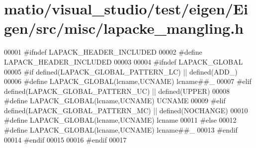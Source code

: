\hypertarget{matio_2visual__studio_2test_2eigen_2_eigen_2src_2misc_2lapacke__mangling_8h_source}{}\section{matio/visual\+\_\+studio/test/eigen/\+Eigen/src/misc/lapacke\+\_\+mangling.h}
\label{matio_2visual__studio_2test_2eigen_2_eigen_2src_2misc_2lapacke__mangling_8h_source}

\begin{DoxyCode}
00001 \textcolor{preprocessor}{#ifndef LAPACK\_HEADER\_INCLUDED}
00002 \textcolor{preprocessor}{#define LAPACK\_HEADER\_INCLUDED}
00003 
00004 \textcolor{preprocessor}{#ifndef LAPACK\_GLOBAL}
00005 \textcolor{preprocessor}{#if defined(LAPACK\_GLOBAL\_PATTERN\_LC) || defined(ADD\_)}
00006 \textcolor{preprocessor}{#define LAPACK\_GLOBAL(lcname,UCNAME)  lcname##\_}
00007 \textcolor{preprocessor}{#elif defined(LAPACK\_GLOBAL\_PATTERN\_UC) || defined(UPPER)}
00008 \textcolor{preprocessor}{#define LAPACK\_GLOBAL(lcname,UCNAME)  UCNAME}
00009 \textcolor{preprocessor}{#elif defined(LAPACK\_GLOBAL\_PATTERN\_MC) || defined(NOCHANGE)}
00010 \textcolor{preprocessor}{#define LAPACK\_GLOBAL(lcname,UCNAME)  lcname}
00011 \textcolor{preprocessor}{#else}
00012 \textcolor{preprocessor}{#define LAPACK\_GLOBAL(lcname,UCNAME)  lcname##\_}
00013 \textcolor{preprocessor}{#endif}
00014 \textcolor{preprocessor}{#endif}
00015 
00016 \textcolor{preprocessor}{#endif}
00017 
\end{DoxyCode}
